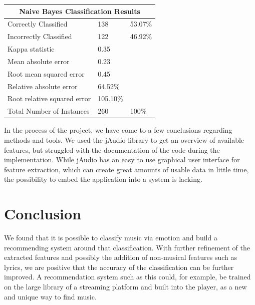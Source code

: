 \begin{multicols}{2}
\begin{center}
\begin{tabular}{@{}lll@{}}
\multicolumn{3}{c}{\textbf{Naive Bayes Classification Results}} \\ \midrule
Correctly Classified             & 138      & 53.07\% \\
Incorrectly Classified           & 122      & 46.92\% \\
Kappa statistic 				 & 0.35     & \\
Mean absolute error  			 & 0.23     & \\
Root mean squared error 		 & 0.45     & \\
Relative absolute error 		 & 64.52\%  & \\
Root relative squared error 	 & 105.10\% & \\
Total Number of Instances 		 & 260      & 100\%
\end{tabular}
\end{center}

In the process of the project, we have come to a few conclusions regarding methods and tools. We used the jAudio library to get an overview of available features, but struggled with the documentation of the code during the implementation. While jAudio has an easy to use graphical user interface for feature extraction, which can create great amounts of usable data in little time, the possibility to embed the application into a system is lacking.

\section{Conclusion}
We found that it is possible to classify music via emotion and build a recommending system around that classification. With further refinement of the extracted features and possibly the addition of non-musical features such as lyrics, we are positive that the accuracy of the classification can be further improved. A recommendation system such as this could, for example, be trained on the large library of a streaming platform and built into the player, as a new and unique way to find music.




\end{multicols}

